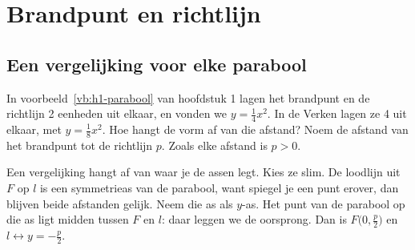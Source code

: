 \section{Brandpunt en richtlijn}

\subsection{Een vergelijking voor elke parabool}

In voorbeeld~\ref{vb:h1-parabool} van hoofdstuk 1 lagen het brandpunt en de richtlijn 2 eenheden uit elkaar, en vonden we $y = \tfrac14 x^2$. In de Verken lagen ze 4 uit elkaar, met $y = \tfrac18 x^2$. Hoe hangt de vorm af van die afstand? Noem de afstand van het brandpunt tot de richtlijn $p$. Zoals elke afstand is $p > 0$.

Een vergelijking hangt af van waar je de assen legt. Kies ze slim. De loodlijn uit $F$ op $l$ is een symmetrieas van de parabool, want spiegel je een punt erover, dan blijven beide afstanden gelijk. Neem die as als $y$-as. Het punt van de parabool op die as ligt midden tussen $F$ en $l$: daar leggen we de oorsprong. Dan is $F\bigl(0, \tfrac p2\bigr)$ en $l \leftrightarrow y = -\tfrac p2$.

